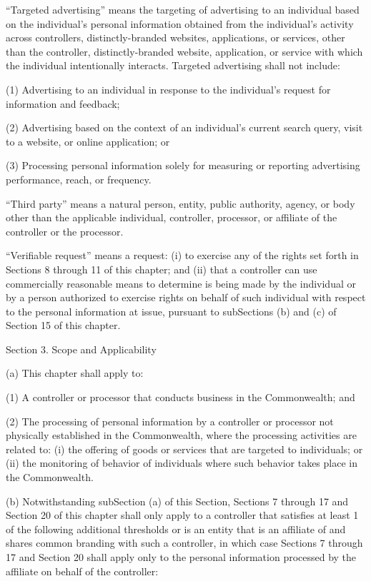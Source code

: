 “Targeted advertising” means the targeting of advertising to an individual based on the individual’s personal information obtained from the individual’s activity across controllers, distinctly-branded websites, applications, or services, other than the controller, distinctly-branded website, application, or service with which the individual intentionally interacts. Targeted advertising shall not include:

(1) Advertising to an individual in response to the individual’s request for information and feedback;

(2) Advertising based on the context of an individual’s current search query, visit to a website, or online application; or

(3) Processing personal information solely for measuring or reporting advertising performance, reach, or frequency. 

“Third party” means a natural person, entity, public authority, agency, or body other than the applicable individual, controller, processor, or affiliate of the controller or the processor.

“Verifiable request” means a request: (i) to exercise any of the rights set forth in Sections 8 through 11 of this chapter; and (ii) that a controller can use commercially reasonable means to determine is being made by the individual or by a person authorized to exercise rights on behalf of such individual with respect to the personal information at issue, pursuant to subSections (b) and (c) of Section 15 of this chapter. 

Section 3. Scope and Applicability

(a) This chapter shall apply to:

(1) A controller or processor that conducts business in the Commonwealth; and

(2) The processing of personal information by a controller or processor not physically established in the Commonwealth, where the processing activities are related to: (i) the offering of goods or services that are targeted to individuals; or (ii) the monitoring of behavior of individuals where such behavior takes place in the Commonwealth.

(b) Notwithstanding subSection (a) of this Section, Sections 7 through 17 and Section 20 of this chapter shall only apply to a controller that satisfies at least 1 of the following additional thresholds or is an entity that is an affiliate of and shares common branding with such a controller, in which case Sections 7 through 17 and Section 20 shall apply only to the personal information processed by the affiliate on behalf of the controller:

